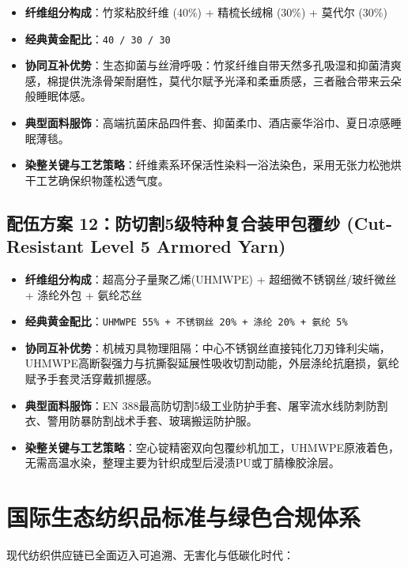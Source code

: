 \documentclass[11pt,openright,twoside,UTF8]{ctexbook}
\begin{document}
\begin{itemize} \setlength{\itemsep}{2.5pt}
    \item \textbf{纤维组分构成}：竹浆粘胶纤维 (40\%) + 精梳长绒棉 (30\%) + 莫代尔 (30\%)
    \item \textbf{经典黄金配比}：\texttt{40 / 30 / 30}
    \item \textbf{协同互补优势}：生态抑菌与丝滑呼吸：竹浆纤维自带天然多孔吸湿和抑菌清爽感，棉提供洗涤骨架耐磨性，莫代尔赋予光泽和柔垂质感，三者融合带来云朵般睡眠体感。
    \item \textbf{典型面料服饰}：高端抗菌床品四件套、抑菌柔巾、酒店豪华浴巾、夏日凉感睡眠薄毯。
    \item \textbf{染整关键与工艺策略}：纤维素系环保活性染料一浴法染色，采用无张力松弛烘干工艺确保织物蓬松透气度。
\end{itemize}
\vspace{0.3cm}

\section{配伍方案 12：防切割5级特种复合装甲包覆纱 (Cut-Resistant Level 5 Armored Yarn)}

\begin{itemize} \setlength{\itemsep}{2.5pt}
    \item \textbf{纤维组分构成}：超高分子量聚乙烯(UHMWPE) + 超细微不锈钢丝/玻纤微丝 + 涤纶外包 + 氨纶芯丝
    \item \textbf{经典黄金配比}：\texttt{UHMWPE 55\% + 不锈钢丝 20\% + 涤纶 20\% + 氨纶 5\%}
    \item \textbf{协同互补优势}：机械刃具物理阻隔：中心不锈钢丝直接钝化刀刃锋利尖端，UHMWPE高断裂强力与抗撕裂延展性吸收切割动能，外层涤纶抗磨损，氨纶赋予手套灵活穿戴抓握感。
    \item \textbf{典型面料服饰}：EN 388最高防切割5级工业防护手套、屠宰流水线防刺防割衣、警用防暴防割战术手套、玻璃搬运防护服。
    \item \textbf{染整关键与工艺策略}：空心锭精密双向包覆纱机加工，UHMWPE原液着色，无需高温水染，整理主要为针织成型后浸渍PU或丁腈橡胶涂层。
\end{itemize}
\vspace{0.3cm}

\chapter{国际生态纺织品标准与绿色合规体系}

现代纺织供应链已全面迈入可追溯、无害化与低碳化时代：
\end{document}
